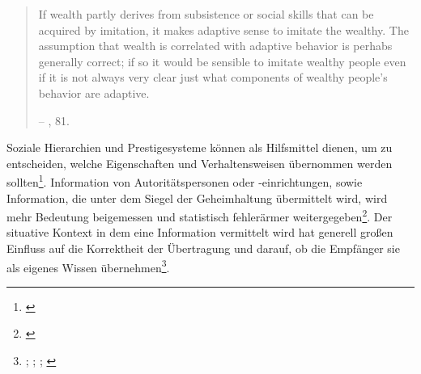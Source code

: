 \documentclass[openany,twoside,twocolumn]{book}
\let\rmarkdownfootnote\footnote%
\def\footnote{\protect\rmarkdownfootnote}
\begin{document}
\begin{quote}
If wealth partly derives from subsistence or social skills that can be
acquired by imitation, it makes adaptive sense to imitate the wealthy.
The assumption that wealth is correlated with adaptive behavior is
perhabs generally correct; if so it would be sensible to imitate wealthy
people even if it is not always very clear just what components of
wealthy people's behavior are adaptive.

-- \textcite{smith_cultural_1992}, 81.
\end{quote}

Soziale Hierarchien und Prestigesysteme können als Hilfsmittel dienen,
um zu entscheiden, welche Eigenschaften und Verhaltensweisen übernommen
werden sollten\footnote{\textcite{rogers_diffusion_1983}}. Information
von Autoritätspersonen oder -einrichtungen, sowie Information, die unter
dem Siegel der Geheimhaltung übermittelt wird, wird mehr Bedeutung
beigemessen und statistisch fehlerärmer weitergegeben\footnote{\textcite{rowlands_role_1993}}.
Der situative Kontext in dem eine Information vermittelt wird hat
generell großen Einfluss auf die Korrektheit der Übertragung und darauf,
ob die Empfänger sie als eigenes Wissen übernehmen\footnote{\textcite{barth_cosmologies_1990};
  \textcite{barth_guru_1990}; \textcite{labov_principles_1994};
  \textcite{whitehouse_memorable_1992}}.
\end{document}

